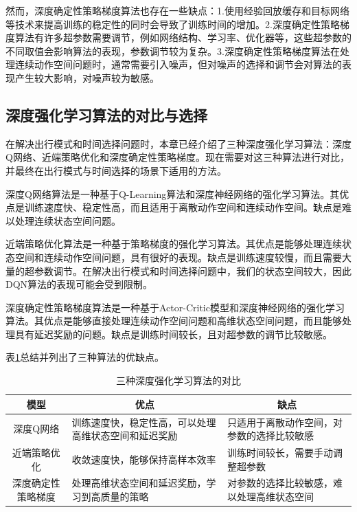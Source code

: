 然而，深度确定性策略梯度算法也存在一些缺点：1.使用经验回放缓存和目标网络等技术来提高训练的稳定性的同时会导致了训练时间的增加。2.深度确定性策略梯度算法有许多超参数需要调节，例如网络结构、学习率、优化器等，这些超参数的不同取值会影响算法的表现，参数调节较为复杂。3.深度确定性策略梯度算法在处理连续动作空间问题时，通常需要引入噪声，但对噪声的选择和调节会对算法的表现产生较大影响，对噪声较为敏感。

\subsection{深度强化学习算法的对比与选择}

在解决出行模式和时间选择问题时，本章已经介绍了三种深度强化学习算法：深度Q网络、近端策略优化和深度确定性策略梯度。现在需要对这三种算法进行对比，并最终在出行模式与时间选择的场景下适用的方法。

深度Q网络算法是一种基于Q-Learning算法和深度神经网络的强化学习算法。其优点是训练速度快、稳定性高，而且适用于离散动作空间和连续动作空间。缺点是难以处理连续状态空间问题。

近端策略优化算法是一种基于策略梯度的强化学习算法。其优点是能够处理连续状态空间和连续动作空间问题，具有很好的表现。缺点是训练速度较慢，而且需要大量的超参数调节。在解决出行模式和时间选择问题中，我们的状态空间较大，因此DQN算法的表现可能会受到限制。


深度确定性策略梯度算法是一种基于Actor-Critic模型和深度神经网络的强化学习算法。其优点是能够直接处理连续动作空间问题和高维状态空间问题，而且能够处理具有延迟奖励的问题。缺点是训练时间较长，且对超参数的调节比较敏感。

表\ref{tab:2_1}总结并列出了三种算法的优缺点。

\renewcommand{\arraystretch}{1.5} %
\begin{table}[htbp]
\centering
\caption{三种深度强化学习算法的对比}
\label{tab:2_1}
\begin{tabular}{cll}
\toprule
模型 & \multicolumn{1}{c}{优点}       & \multicolumn{1}{c}{缺点}     \\
\midrule
深度Q网络                       & \parbox[t]{5.5cm}{训练速度快，稳定性高，可以处理高维状态空间和延迟奖励}      & \parbox[t]{5.5cm}{只适用于离散动作空间，对参数的选择比较敏感 }                       \\
近端策略优化                       & \parbox[t]{5.5cm}{收敛速度快，能够保持高样本效率}    & \parbox[t]{5.5cm}{训练时间较长，需要手动调整超参数}              \\ 
深度确定性策略梯度                    & \parbox[t]{5.5cm}{处理高维状态空间和延迟奖励，学习到高质量的策略}   & \parbox[t]{5.5cm}{对参数的选择比较敏感，难以处理高维状态空间}              \\
\bottomrule
\end{tabular}
\end{table}



